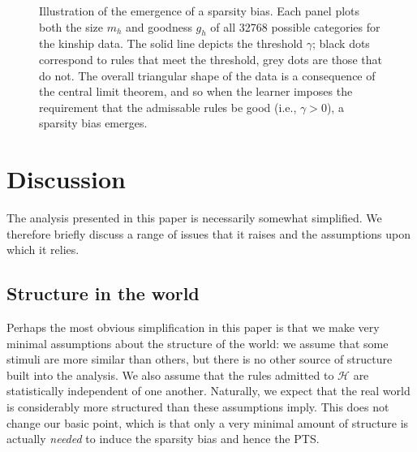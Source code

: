 \documentclass{apa}
\newcommand{\ruleset}{\mathcal{H}}
\begin{document}
\begin{figure}
\begin{center}
\caption{Illustration of the emergence of a sparsity bias. Each panel plots both the size $m_h$ and goodness $g_h$ of all 32768 possible categories for the kinship data. The solid line depicts the threshold $\gamma$; black dots correspond to rules that meet the threshold, grey dots are those that do not. The overall triangular shape of the data is a consequence of the central limit theorem, and so when the learner imposes the requirement that the admissable rules be good (i.e., $\gamma>0$), a sparsity bias emerges.} \label{rulethresholds}
\end{center}
\end{figure}








\section{Discussion}

The analysis presented in this paper is necessarily somewhat simplified. We therefore briefly discuss a range of issues that it raises and the assumptions upon which it relies.


\subsection{Structure in the world}

Perhaps the most obvious simplification in this paper is that we make very minimal assumptions about the structure of the world: we assume that some stimuli are more similar than others, but there is no other source of structure built into the analysis. We also assume that the rules admitted to $\ruleset$ are statistically independent of one another. Naturally, we expect that the real world is considerably more structured than these assumptions imply. This does not change our basic point, which is that only a very minimal amount of structure is actually {\it needed} to induce the sparsity bias and hence the PTS.
\end{document}
